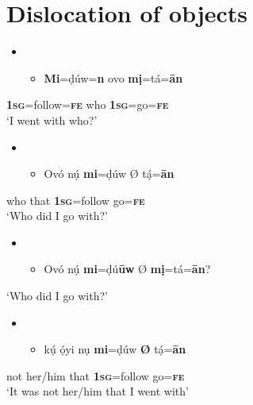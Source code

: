 \chapter[Dislocation of objects]{Dislocation of objects}
\label{bkm:Ref406339397}\begin{itemize}
\item \setcounter{itemize}{0}
\begin{itemize}
\item \gll \textbf{Mi}=ḍúw=\textbf{n }    ovo     \textbf{mị}=tá=\textbf{\={a}n}\\
\end{itemize}
\end{itemize}
     \textbf{  }\textbf{1}\textbf{\textsc{sg}}=follow=\textbf{\textsc{fe}}   who   \textbf{1}\textbf{\textsc{sg}}=go=\textbf{\textsc{fe}}\\
\glt ‘I went with who?’
\z

\begin{itemize}
\item \setcounter{itemize}{0}
\begin{itemize}
\item \gll Ovó   nụ́   \textbf{mi}=ḍúw    Ø  tạ́=\textbf{\={a}n}\\
\end{itemize}
\end{itemize}
     \textbf{  }who   that   \textbf{1}\textbf{\textsc{sg}}=follow     go=\textbf{\textsc{fe}}\\
\glt ‘Who did I go with?’
\z

\begin{itemize}
\item \setcounter{itemize}{0}
\begin{itemize}
\item \gll *Ovó nụ́ \textbf{mi}=ḍú\textbf{\={u}w} Ø \textbf{mị}=tá=\textbf{\={a}n}?\\
\end{itemize}
\end{itemize}
\glt ‘Who did I go with?’
\z

\begin{itemize}
\item \setcounter{itemize}{0}
\begin{itemize}
\item \gll kụ́   ọ́yi     nụ     \textbf{mi}=ḍúw   \textbf{Ø}  tạ́=\textbf{\={a}n}\\
\end{itemize}
\end{itemize}
       not   her/him   that     \textbf{\textsc{1sg}}=follow     go=\textbf{\textsc{fe}}\\
\glt ‘It was not her/him that I went with’ 
\z


